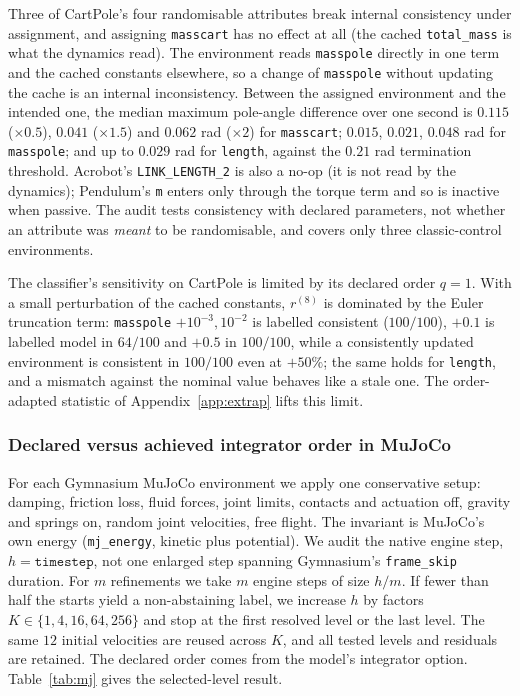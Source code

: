 \documentclass[10pt]{article}
\theoremstyle{definition}
\begin{document}
Three of CartPole's four randomisable attributes break internal consistency
under assignment, and assigning \texttt{masscart} has no effect at all (the
cached \texttt{total\_mass} is what the dynamics read). The environment reads
\texttt{masspole} directly in one term and the cached constants elsewhere, so a
change of \texttt{masspole} without updating the cache is an internal
inconsistency. Between the assigned environment and the intended one,
the median maximum pole-angle difference over one second is $0.115$ ($\times0.5$),
$0.041$ ($\times1.5$) and $0.062$ rad ($\times2$) for \texttt{masscart}; $0.015$,
$0.021$, $0.048$ rad for \texttt{masspole}; and up to $0.029$ rad for
\texttt{length}, against the $0.21$ rad termination threshold. Acrobot's
\texttt{LINK\_LENGTH\_2} is also a no-op (it is not read by the dynamics);
Pendulum's \texttt{m} enters only through the torque term and so is inactive
when passive. The audit tests consistency with declared parameters, not
whether an attribute was \emph{meant} to be randomisable, and covers only
three classic-control environments.

The classifier's sensitivity on CartPole is limited by its declared order $q=1$.
With a small perturbation of the cached constants, $r^{(8)}$ is dominated by the
Euler truncation term: \texttt{masspole} $+10^{-3},10^{-2}$ is labelled
consistent ($100/100$), $+0.1$ is labelled model in $64/100$ and $+0.5$ in
$100/100$, while a consistently updated environment is consistent in $100/100$
even at $+50\%$; the same holds for \texttt{length}, and a mismatch against the nominal value behaves like a stale one. The order-adapted statistic of
Appendix~\ref{app:extrap} lifts this limit.

\subsubsection{Declared versus achieved integrator order in MuJoCo}\label{sec:audit:mj}

For each Gymnasium MuJoCo environment we apply one conservative setup:
damping, friction loss, fluid forces, joint limits, contacts and actuation
off, gravity and springs on, random joint velocities, free flight. The
invariant is MuJoCo's own energy (\texttt{mj\_energy}, kinetic plus
potential). We audit the native engine step, $h=\texttt{timestep}$, not one
enlarged step spanning Gymnasium's \texttt{frame\_skip} duration. For $m$
refinements we take $m$ engine steps of size $h/m$. If fewer than half the
starts yield a non-abstaining label, we increase $h$ by factors
$K\in\{1,4,16,64,256\}$ and stop at the first resolved level or the last
level. The same $12$ initial velocities are reused across $K$, and all tested
levels and residuals are retained. The declared order comes from the model's
integrator option. Table~\ref{tab:mj} gives the selected-level result.
\end{document}
